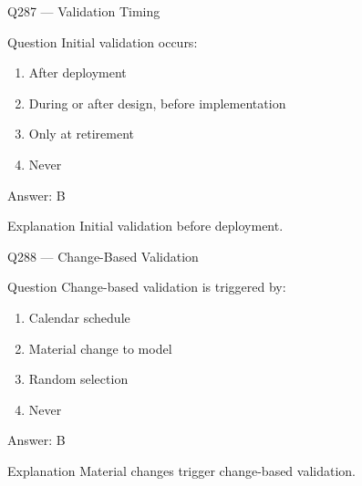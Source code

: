 \documentclass[aspectratio=169,8pt]{beamer}
\begin{document}
										\begin{frame}{Q287 --- Validation Timing}
											\begin{block}{Question}
												Initial validation occurs:
												\begin{enumerate}
													\item After deployment
													\item During or after design, before implementation
													\item Only at retirement
													\item Never
												\end{enumerate}
											\end{block}
											\begin{exampleblock}{Answer: B}\end{exampleblock}
											\begin{block}{Explanation}
												Initial validation before deployment.
											\end{block}
										\end{frame}
										
										\begin{frame}{Q288 --- Change-Based Validation}
											\begin{block}{Question}
												Change-based validation is triggered by:
												\begin{enumerate}
													\item Calendar schedule
													\item Material change to model
													\item Random selection
													\item Never
												\end{enumerate}
											\end{block}
											\begin{exampleblock}{Answer: B}\end{exampleblock}
											\begin{block}{Explanation}
												Material changes trigger change-based validation.
											\end{block}
										\end{frame}
										
\end{document}
